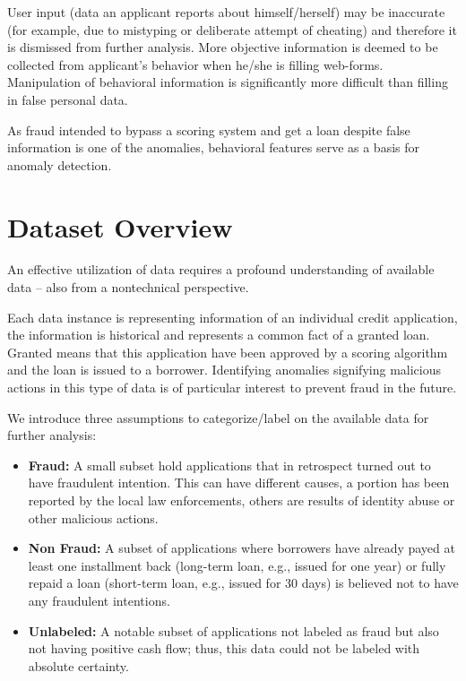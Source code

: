 User input (data an applicant reports about himself/herself) may be inaccurate (for example, due to mistyping or deliberate attempt of cheating) and therefore it is dismissed from further analysis.
More objective information is deemed to be collected from  applicant's behavior when he/she is filling web-forms. Manipulation of behavioral information is significantly more difficult than filling in false personal data.

As fraud intended to bypass a scoring system and get a loan despite false information is one of the anomalies, behavioral features serve as a basis for anomaly detection. 

\section{Dataset Overview}\label{Ch:2:Overview}
An effective utilization of data requires a profound understanding of available data -- also from a nontechnical perspective.

Each data instance is representing information of an individual credit application, the information is historical and represents a common fact of a granted loan. Granted means that this application have been approved by a scoring algorithm and the loan is issued to a borrower. Identifying anomalies signifying malicious actions in this type of data is of particular interest to prevent fraud in the future.

We introduce three assumptions to categorize/label on the available data for further analysis: 

\begin{itemize}
\item \textbf{Fraud:} 
A small subset hold applications that in retrospect turned out to have fraudulent intention. This can have different causes, a portion has been reported by the local law enforcements, others are results of identity abuse or other malicious actions.

\item \textbf{Non Fraud:} 
A subset of applications where borrowers have already payed at least one installment back (long-term loan, e.g., issued for one year) or fully repaid a loan (short-term loan, e.g., issued for 30 days) is believed not to have any fraudulent intentions. 

\item \textbf{Unlabeled:}
A notable subset of applications not labeled as fraud but also not having positive cash flow; thus, this data could not be labeled with absolute certainty.

\end{itemize}


